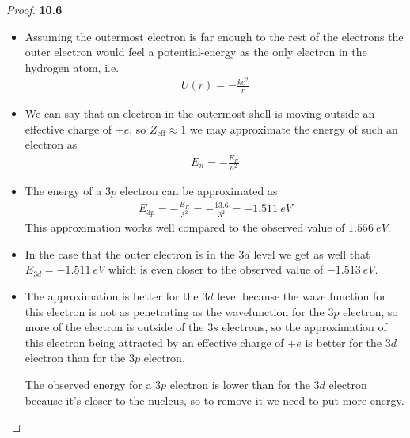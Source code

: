 \documentclass[11pt]{article}
\theoremstyle{definition}
\begin{document}
\cleardoublepage
\begin{proof}{\textbf{10.6}}
\begin{itemize}
\item [\textbf{(a)}] Assuming the outermost electron is far enough to
the rest of the electrons the outer electron would feel a potential-energy
as the only electron in the hydrogen atom, i.e.
\begin{align*}
    U(r) = -\frac{ke^2}{r}
\end{align*}

\item [\textbf{(b)}] We can say that an electron in the outermost shell is
moving outside an effective charge of $+e$, so $Z_{\text{eff}} \approx 1$ 
we may approximate the energy of such an electron as
\begin{align*}
    E_{n} = -\frac{E_R}{n^2}
\end{align*}

\item [\textbf{(c)}] The energy of a $3p$ electron can be approximated as
\begin{align*}
    E_{3p} = -\frac{E_R}{3^2} = -\frac{13.6}{3^2} = -1.511~eV
\end{align*}
This approximation works well compared to the observed value of $1.556~eV$.

\item [\textbf{(d)}] In the case that the outer electron is in the $3d$ level
we get as well that $E_{3d} = -1.511~eV$ which is even closer to the observed
value of $-1.513~eV$.

\item [\textbf{(e)}] The approximation is better for the $3d$ level because the
wave function for this electron is not as penetrating as the wavefunction for
the $3p$ electron, so more of the electron is outside of the $3s$ electrons, 
so the approximation of this electron being attracted by an effective charge of
$+e$ is better for the $3d$ electron than for the $3p$ electron.

The observed energy for a $3p$ electron is lower than for the $3d$ electron 
because it's closer to the nucleus, so to remove it we need to put more energy.
\end{itemize}
\end{proof}
\end{document}
